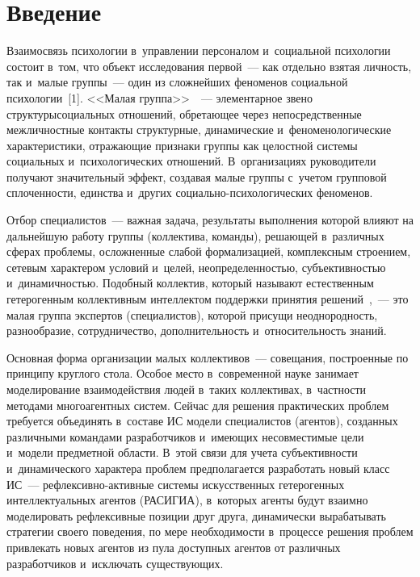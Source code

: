


\thispagestyle{headings}

\begin{multicols}{2}

\label{st\stat}
  
\section{Введение}

  Взаимосвязь психологии в~управлении персоналом и~социальной психологии 
состоит в~том, что объект исследования первой~--- как отдельно взятая 
личность, так и~малые группы~--- один из сложнейших феноменов социальной 
психологии~[1]. <<Малая группа>>~\cite{2-r}~--- элементарное звено 
структуры\linebreak социальных отношений, обретающее через непосредственные 
межличностные контакты структурные, динамические и~феноменологические 
характеристики, отражающие признаки группы как \mbox{целостной} системы 
социальных и~психологических отношений. В~организациях руководители 
получают значительный эффект, создавая малые группы с~учетом групповой 
сплоченности, единства и~других социально-психологических феноменов. 

Отбор специалистов~--- важная задача, результаты выполнения которой влияют 
на дальнейшую работу группы (коллектива, команды), ре\-ша\-ющей в~различных 
сферах проб\-ле\-мы, \mbox{осложненные} слабой формализацией, комплексным 
строением, сетевым характером условий и~целей, неопределенностью, 
субъективностью и~ди\-на\-мич\-ностью. Подобный коллектив, который называют 
естественным гетерогенным коллективным интеллектом поддержки принятия 
решений~\cite{3-r},~--- это малая группа экспертов (специалистов), которой\linebreak 
присущи не\-од\-но\-род\-ность, разнообразие, сотрудничество, до\-пол\-ни\-тель\-ность 
и~относительность знаний. 

Основная форма организации малых  
коллективов~--- совещания, построенные по принципу круглого стола. Особое 
место в~современной науке занимает моделирование взаимодействия людей 
в~таких коллективах, в~частности методами многоагентных систем. Сейчас для 
решения практических проблем требуется объединять в~составе 
ИС модели специалистов (агентов), созданных 
различными командами разработчиков и~имеющих несовместимые цели 
и~модели предметной области. В~этой связи для учета субъективности 
и~динамического характера проблем предполагается разработать новый класс 
ИС~--- реф\-лек\-сив\-но-ак\-тив\-ные сис\-те\-мы искусственных гетерогенных 
интеллектуальных агентов (\mbox{РАСИГИА}), в~которых агенты будут 
взаимно моделировать рефлексивные позиции друг друга, динамически 
вырабатывать стратегии своего поведения, по мере необходимости в~процессе 
решения проблем привлекать новых агентов из пула доступных агентов от 
различных разработчиков и~исключать существующих. 


\end{multicols}
